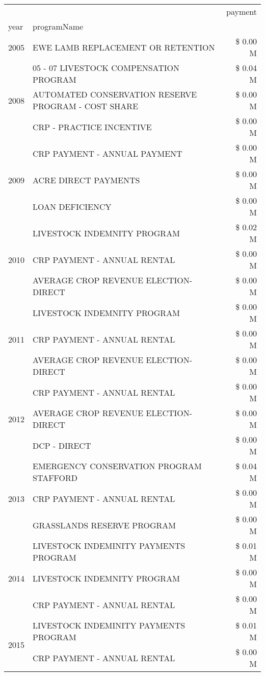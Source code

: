 \begin{tabular}{llr}
\toprule
 &  & payment \\
year & programName &  \\
\midrule
2005 & EWE LAMB REPLACEMENT OR RETENTION & \$ 0.00 M \\
\cline{1-3}
\multirow[t]{3}{*}{2008} & 05 - 07 LIVESTOCK COMPENSATION PROGRAM & \$ 0.04 M \\
 & AUTOMATED CONSERVATION RESERVE PROGRAM - COST SHARE & \$ 0.00 M \\
 & CRP - PRACTICE INCENTIVE & \$ 0.00 M \\
\cline{1-3}
\multirow[t]{3}{*}{2009} & CRP PAYMENT - ANNUAL PAYMENT & \$ 0.00 M \\
 & ACRE DIRECT PAYMENTS & \$ 0.00 M \\
 & LOAN DEFICIENCY & \$ 0.00 M \\
\cline{1-3}
\multirow[t]{3}{*}{2010} & LIVESTOCK INDEMNITY PROGRAM & \$ 0.02 M \\
 & CRP PAYMENT - ANNUAL RENTAL & \$ 0.00 M \\
 & AVERAGE CROP REVENUE ELECTION-DIRECT & \$ 0.00 M \\
\cline{1-3}
\multirow[t]{3}{*}{2011} & LIVESTOCK INDEMNITY PROGRAM & \$ 0.00 M \\
 & CRP PAYMENT - ANNUAL RENTAL & \$ 0.00 M \\
 & AVERAGE CROP REVENUE ELECTION-DIRECT & \$ 0.00 M \\
\cline{1-3}
\multirow[t]{3}{*}{2012} & CRP PAYMENT - ANNUAL RENTAL & \$ 0.00 M \\
 & AVERAGE CROP REVENUE ELECTION-DIRECT & \$ 0.00 M \\
 & DCP - DIRECT & \$ 0.00 M \\
\cline{1-3}
\multirow[t]{3}{*}{2013} & EMERGENCY CONSERVATION PROGRAM STAFFORD & \$ 0.04 M \\
 & CRP PAYMENT - ANNUAL RENTAL & \$ 0.00 M \\
 & GRASSLANDS RESERVE PROGRAM & \$ 0.00 M \\
\cline{1-3}
\multirow[t]{3}{*}{2014} & LIVESTOCK INDEMINITY PAYMENTS PROGRAM & \$ 0.01 M \\
 & LIVESTOCK INDEMNITY PROGRAM & \$ 0.00 M \\
 & CRP PAYMENT - ANNUAL RENTAL & \$ 0.00 M \\
\cline{1-3}
\multirow[t]{3}{*}{2015} & LIVESTOCK INDEMINITY PAYMENTS PROGRAM & \$ 0.01 M \\
 & CRP PAYMENT - ANNUAL RENTAL & \$ 0.00 M \\

\end{tabular}
